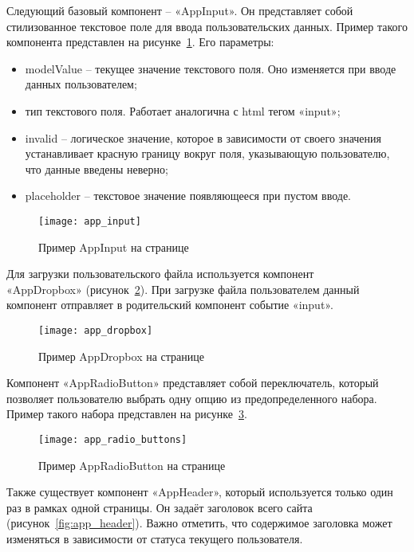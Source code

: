 Следующий базовый компонент – «AppInput». Он представляет собой стилизованное текстовое поле для ввода пользовательских данных. Пример такого компонента представлен на рисунке~\ref{fig:app_input}. Его параметры:

\begin{itemize}
    \item modelValue – текущее значение текстового поля. Оно изменяется при вводе данных пользователем;
    \item тип текстового поля. Работает аналогична с html тегом «input»;
    \item invalid – логическое значение, которое в зависимости от своего значения устанавливает красную границу вокруг поля, указывающую пользователю, что данные введены неверно;
    \item placeholder – текстовое значение появляющееся при пустом вводе.
\end{itemize}

\begin{figure}[h]
    \centering
    \texttt{[image: app\_input]}
    \caption{Пример AppInput на странице}\label{fig:app_input}
\end{figure}

Для загрузки пользовательского файла используется компонент \\«AppDropbox» (рисунок~\ref{fig:app_dropbox}). При загрузке файла пользователем данный компонент отправляет в родительский компонент событие «input».

\begin{figure}[h]
    \centering
    \texttt{[image: app\_dropbox]}
    \caption{Пример AppDropbox на странице}\label{fig:app_dropbox}
\end{figure}

Компонент «AppRadioButton» представляет собой переключатель, который позволяет пользователю выбрать одну опцию из предопределенного набора. Пример такого набора представлен на рисунке~\ref{fig:app_radio_buttons}.

\begin{figure}[h]
    \centering
    \texttt{[image: app\_radio\_buttons]}
    \caption{Пример AppRadioButton на странице}\label{fig:app_radio_buttons}
\end{figure}

Также существует компонент «AppHeader», который используется только один раз в рамках одной страницы. Он задаёт заголовок всего сайта (рисунок~\ref{fig:app_header}). Важно отметить, что содержимое заголовка может изменяться в зависимости от статуса текущего пользователя.

